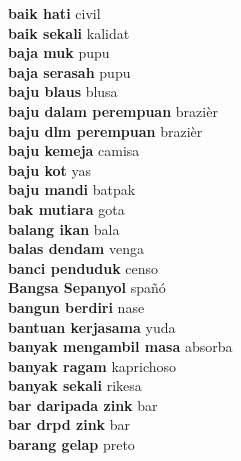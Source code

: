 \textbf{ baik hati  } civil \\
\textbf{ baik sekali  } kalidat \\
\textbf{ baja muk  } pupu \\
\textbf{ baja serasah  } pupu \\
\textbf{ baju blaus  } blusa \\
\textbf{ baju dalam perempuan  } brazièr \\
\textbf{ baju dlm perempuan  } brazièr \\
\textbf{ baju kemeja  } camisa \\
\textbf{ baju kot  } yas \\
\textbf{ baju mandi  } batpak \\
\textbf{ bak mutiara  } gota \\
\textbf{ balang ikan  } bala \\
\textbf{ balas dendam  } venga \\
\textbf{ banci penduduk  } censo \\
\textbf{ Bangsa Sepanyol  } spañó \\
\textbf{ bangun berdiri  } nase \\
\textbf{ bantuan kerjasama  } yuda \\
\textbf{ banyak mengambil masa  } absorba \\
\textbf{ banyak ragam  } kaprichoso \\
\textbf{ banyak sekali  } rikesa \\
\textbf{ bar daripada zink  } bar \\
\textbf{ bar drpd zink  } bar \\
\textbf{ barang gelap  } preto \\
